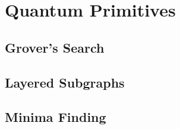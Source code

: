 \section{Quantum Primitives}\label{sec:quantum-primitives}

\subsection{Grover's Search}

\subsection{Layered Subgraphs}

\subsection{Minima Finding}